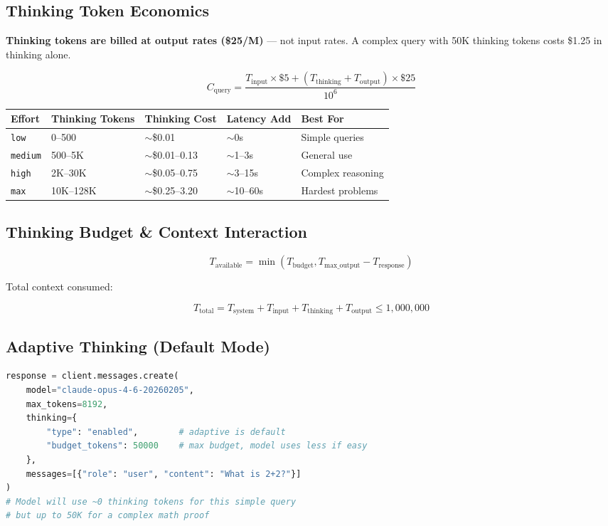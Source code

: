 \documentclass[11pt,a4paper]{article}
\begin{document}
\subsection{Thinking Token Economics}

\begin{tcolorbox}[colback=red!3, colframe=red!50!black, title={\bfseries Critical Cost Consideration}]
\textbf{Thinking tokens are billed at output rates (\$25/M)} --- not input rates. A complex query with 50K thinking tokens costs \$1.25 in thinking alone.
\end{tcolorbox}

$$C_{\text{query}} = \frac{T_{\text{input}} \times \$5 + (T_{\text{thinking}} + T_{\text{output}}) \times \$25}{10^6}$$

\begin{center}
\begin{tabular}{lllll}
\toprule
\textbf{Effort} & \textbf{Thinking Tokens} & \textbf{Thinking Cost} & \textbf{Latency Add} & \textbf{Best For} \\
\midrule
\texttt{low} & 0--500 & $\sim$\$0.01 & $\sim$0s & Simple queries \\
\texttt{medium} & 500--5K & $\sim$\$0.01--0.13 & $\sim$1--3s & General use \\
\texttt{high} & 2K--30K & $\sim$\$0.05--0.75 & $\sim$3--15s & Complex reasoning \\
\texttt{max} & 10K--128K & $\sim$\$0.25--3.20 & $\sim$10--60s & Hardest problems \\
\bottomrule
\end{tabular}
\end{center}

\subsection{Thinking Budget \& Context Interaction}

$$T_{\text{available}} = \min(T_{\text{budget}}, T_{\text{max\_output}} - T_{\text{response}})$$

Total context consumed:

$$T_{\text{total}} = T_{\text{system}} + T_{\text{input}} + T_{\text{thinking}} + T_{\text{output}} \leq 1{,}000{,}000$$

\subsection{Adaptive Thinking (Default Mode)}

\begin{lstlisting}[language=Python, caption={Adaptive Thinking (Recommended)}]
response = client.messages.create(
    model="claude-opus-4-6-20260205",
    max_tokens=8192,
    thinking={
        "type": "enabled",        # adaptive is default
        "budget_tokens": 50000    # max budget, model uses less if easy
    },
    messages=[{"role": "user", "content": "What is 2+2?"}]
)
# Model will use ~0 thinking tokens for this simple query
# but up to 50K for a complex math proof
\end{lstlisting}
\end{document}
